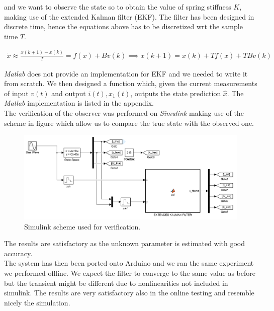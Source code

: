 and we want to observe the state so to obtain the value of spring stiffness $K$, making use of the extended Kalman filter (EKF). The filter has been designed in discrete time, hence the equations above has to be discretized wrt the sample time $T$.

\begin{eqnarray}
	\dot{x} \approx \frac{x(k+1)-x(k)}{T} = f(x) + Bv(k)
	\implies x(k+1) = x(k) + Tf(x) + TBv(k)
\end{eqnarray}

\emph{Matlab} does not provide an implementation for EKF and we needed to write it from scratch. We then designed a function which, given the current measurements of input $v(t)$ and output $i(t), x_1(t)$, outputs the state prediction $\hat{x}$. The \emph{Matlab} implementation is listed in the appendix.\\

The verification of the observer was performed on \emph{Simulink} making use of the scheme in figure which allow us to compare the true state with the observed one.\\

 
\begin{figure}[h]
\centering
\includegraphics[width=0.7\linewidth]{img/ekf_scheme}
\caption{Simulink scheme used for verification.}
\label{fig:ekfscheme}
\end{figure}

The results are satisfactory as the unknown parameter is estimated with good accuracy.\\


The system has then been ported onto Arduino and we ran the same experiment we performed offline. We expect the filter to converge to the same value as before but the transient might be different due to nonlinearities not included in simulink. The results are very satisfactory also in the online testing and resemble nicely the simulation.\\



